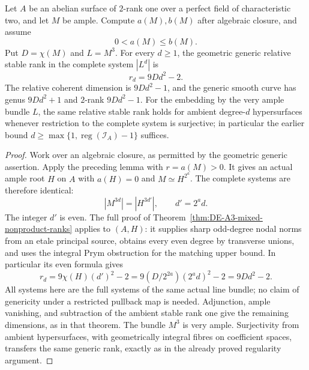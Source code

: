 \begin{theorem}
\label{thm:DE-A3-mixed-index-ordered-ranks}
Let $A$ be an abelian surface of $2$-rank one over a perfect field
of characteristic two, and let $M$ be ample.  Compute $a(M),b(M)$
after algebraic closure, and assume
\[
                         0<a(M)\le b(M).
\]
Put $D=\chi(M)$ and $L=M^3$.  For every $d\ge1$, the geometric
generic relative stable rank in the complete system $|L^d|$ is
\[
                             r_d=9Dd^2-2.              \tag{DE-CP2}
\]
The relative coherent dimension is $9Dd^2-1$, and the generic
smooth curve has genus $9Dd^2+1$ and $2$-rank $9Dd^2-1$.
For the embedding by the very ample bundle $L$, the same relative
stable rank holds for ambient degree-$d$ hypersurfaces whenever
restriction to the complete system is surjective; in particular
the earlier bound
$d\ge\max\{1,\operatorname{reg}(\mathcal I_A)-1\}$ suffices.
\end{theorem}
\begin{proof}
Work over an algebraic closure, as permitted by the geometric
generic assertion.  Apply the preceding lemma with $r=a(M)>0$.
It gives an actual ample root $H$ on $A$ with $a(H)=0$ and
$M\simeq H^{2^a}$.  The complete systems are therefore identical:
\[
             |M^{3d}|=|H^{3d'}|,\qquad d'=2^a d.
\]
The integer $d'$ is even.  The full proof of
Theorem~\ref{thm:DE-A3-mixed-nonproduct-ranks} applies to $(A,H)$:
it supplies sharp odd-degree nodal norms from an etale principal
source, obtains every even degree by transverse unions, and uses
the integral Prym obstruction for the matching upper bound.
In particular its even formula gives
\[
 r_d=9\chi(H)(d')^2-2
     =9(D/2^{2a})(2^a d)^2-2
     =9Dd^2-2.
\]
All systems here are the full systems of the same actual line
bundle; no claim of genericity under a restricted pullback map is
needed.  Adjunction, ample vanishing, and subtraction of the ambient
stable rank one give the remaining dimensions, as in that theorem.
The bundle $M^3$ is very ample.  Surjectivity from ambient
hypersurfaces, with geometrically integral fibres on coefficient
spaces, transfers the same generic rank, exactly as in the already
proved regularity argument.
\end{proof}

